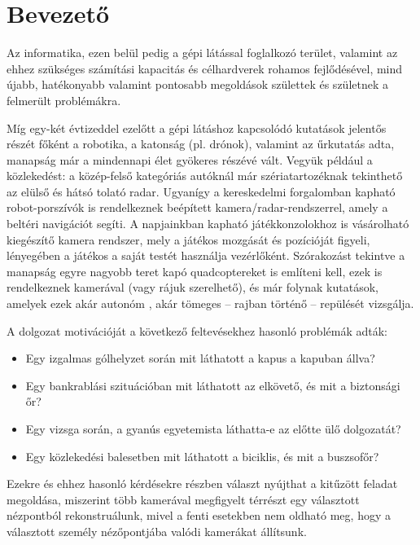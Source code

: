 \chapter*{Bevezető}

Az informatika, ezen belül pedig a gépi látással foglalkozó terület, valamint az ehhez szükséges számítási kapacitás és célhardverek rohamos fejlődésével, mind újabb, hatékonyabb valamint pontosabb megoldások születtek és születnek a felmerült problémákra.

Míg egy-két évtizeddel ezelőtt a gépi látáshoz kapcsolódó kutatások jelentős részét főként a robotika, a katonság (pl. drónok), valamint az űrkutatás adta, manapság már a mindennapi élet gyökeres részévé vált. Vegyük például a közlekedést: a közép-felső kategóriás autóknál már szériatartozéknak tekinthető az elülső és hátsó tolató radar. Ugyanígy a kereskedelmi forgalomban kapható robot-porszívók is rendelkeznek beépített kamera/radar-rendszerrel, amely a beltéri navigációt segíti. A napjainkban kapható játékkonzolokhoz is vásárolható kiegészítő kamera rendszer, mely a játékos mozgását és pozícióját figyeli, lényegében a játékos a saját testét használja vezérlőként. Szórakozást tekintve a manapság egyre nagyobb teret kapó quadcoptereket \cite{quadropter} is említeni kell, ezek is rendelkeznek kamerával (vagy rájuk szerelhető), és már folynak kutatások, amelyek ezek akár autonóm \cite{quad-autonomous}, akár tömeges \cite{quad-swarm} -- rajban történő -- repülését vizsgálja.

A dolgozat motivációját a következő feltevésekhez hasonló problémák adták:
\begin{itemize}
\item Egy izgalmas gólhelyzet során mit láthatott a kapus a kapuban állva?
\item Egy bankrablási szituációban mit láthatott az elkövető, és mit a biztonsági őr?
\item Egy vizsga során, a gyanús egyetemista láthatta-e az előtte ülő dolgozatát?
\item Egy közlekedési balesetben mit láthatott a biciklis, és mit a buszsofőr?
\end{itemize}

Ezekre és ehhez hasonló kérdésekre részben választ nyújthat a kitűzött feladat megoldása, miszerint több kamerával megfigyelt térrészt egy választott nézpontból rekonstruálunk, mivel a fenti esetekben nem oldható meg, hogy a választott személy nézőpontjába valódi kamerákat állítsunk.

